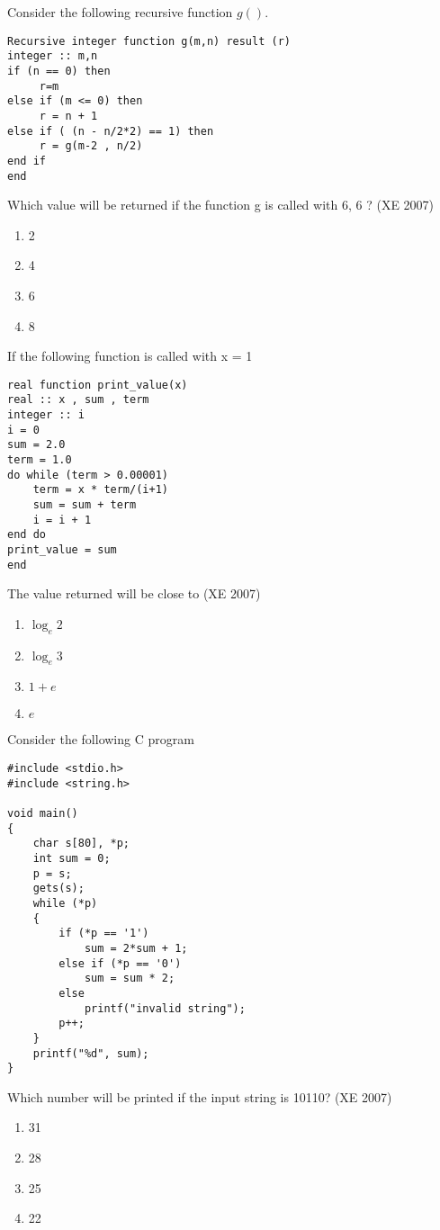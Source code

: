 \item Consider the following recursive function $g()$.\\
\begin{verbatim}
Recursive integer function g(m,n) result (r)
integer :: m,n
if (n == 0) then
     r=m
else if (m <= 0) then
     r = n + 1
else if ( (n - n/2*2) == 1) then 
     r = g(m-2 , n/2)
end if 
end               
\end{verbatim}
Which value will be returned if the function g  is called with 6, 6 ?
\hfill{(XE 2007)}
\begin{multicols}{4}
\begin{enumerate}
\item 2
\item 4
\item 6
\item 8
\end{enumerate}
 \end{multicols}

\item If the following function is called with  x = 1 \\

\begin{verbatim}
real function print_value(x)
real :: x , sum , term
integer :: i
i = 0
sum = 2.0
term = 1.0
do while (term > 0.00001)
    term = x * term/(i+1)
    sum = sum + term
    i = i + 1
end do
print_value = sum
end
\end{verbatim}


The value returned will be close to
\hfill{(XE 2007)}
\begin{multicols}{4}
\begin{enumerate}
\item $\log_e 2$ 
\item $\log_e 3 $
\item $1 + e$ 
\item $e $
\end{enumerate}
\end{multicols}
    
\item Consider the following C program \\ 
\begin{verbatim}
#include <stdio.h>
#include <string.h>

void main()
{
    char s[80], *p;
    int sum = 0;
    p = s;
    gets(s);
    while (*p)
    {
        if (*p == '1')
            sum = 2*sum + 1;
        else if (*p == '0')
            sum = sum * 2;
        else
            printf("invalid string");
        p++;
    }
    printf("%d", sum);
}
\end{verbatim}
Which number will be printed if the input string is 10110?
\hfill{(XE 2007)}
\begin{multicols}{4}
\begin{enumerate}
\item 31
\item 28
\item 25
\item 22
\end{enumerate}    
\end{multicols}



